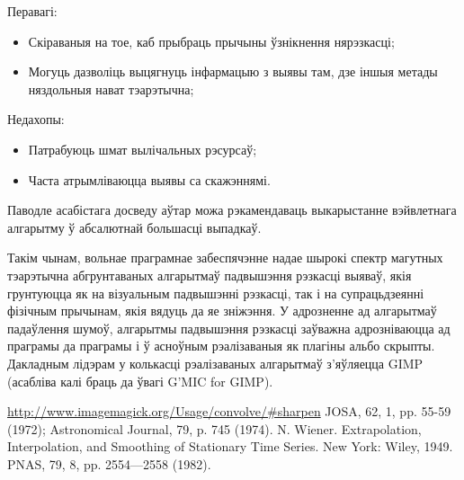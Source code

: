 \documentclass[10pt, a5paper]{article}
\begin{document}
Перавагі:

\begin{itemize}
  \item Скіраваныя на тое, каб прыбраць прычыны ўзнікнення нярэзкасці;
  \item Могуць дазволіць выцягнуць інфармацыю з выявы там, дзе іншыя метады няздольныя нават тэарэтычна;
\end{itemize}

Недахопы:

\begin{itemize}
  \item Патрабуюць шмат вылічальных рэсурсаў;
  \item Часта атрымліваюцца выявы са скажэннямі.
\end{itemize}

Паводле асабістага досведу аўтар можа рэкамендаваць выкарыстанне вэйвлетнага алгарытму ў абсалютнай большасці выпадкаў.

Такім чынам, вольнае праграмнае забеспячэнне надае шырокі спектр магутных тэарэтычна абгрунтаваных алгарытмаў падвышэння рэзкасці выяваў, якія грунтуюцца як на візуальным падвышэнні рэзкасці, так і на супрацьдзеянні фізічным прычынам, якія вядуць да яе зніжэння. У адрозненне ад алгарытмаў падаўлення шумоў, алгарытмы падвышэння рэзкасці заўважна адрозніваюцца ад праграмы да праграмы і ў асноўным рэалізаваныя як плагіны альбо скрыпты. Дакладным лідэрам у колькасці рэалізаваных алгарытмаў з’яўляецца {GIMP} (асабліва калі браць да ўвагі {G'MIC} for {GIMP}).

\begin{thebibliography}{9}
 \url{http://www.imagemagick.org/Usage/convolve/#sharpen}
 JOSA, 62, 1, pp. 55-59 (1972); Astronomical Journal, 79, p. 745 (1974).
 N. Wiener. Extrapolation, Interpolation, and Smoothing of Stationary Time Series. New York: Wiley, 1949.
 PNAS, 79, 8, pp. 2554—2558 (1982).
\end{thebibliography}
\end{document}
